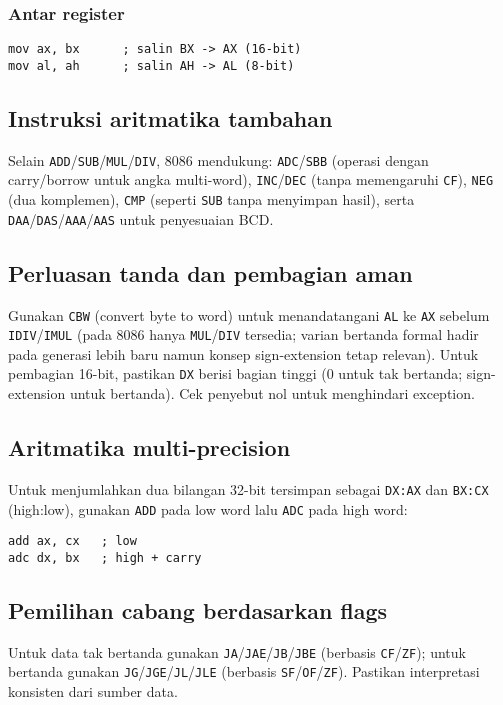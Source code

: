 \subsubsection{Antar register}
\begin{verbatim}
mov ax, bx      ; salin BX -> AX (16-bit)
mov al, ah      ; salin AH -> AL (8-bit)
\end{verbatim}

\subsection{Instruksi aritmatika tambahan}
Selain \texttt{ADD}/\texttt{SUB}/\texttt{MUL}/\texttt{DIV}, 8086 mendukung: \texttt{ADC}/\texttt{SBB} (operasi dengan carry/borrow untuk angka multi-word), \texttt{INC}/\texttt{DEC} (tanpa memengaruhi \texttt{CF}), \texttt{NEG} (dua komplemen), \texttt{CMP} (seperti \texttt{SUB} tanpa menyimpan hasil), serta \texttt{DAA}/\texttt{DAS}/\texttt{AAA}/\texttt{AAS} untuk penyesuaian BCD. \cite{intel2019manual32,rbil}

\subsection{Perluasan tanda dan pembagian aman}
Gunakan \texttt{CBW} (convert byte to word) untuk menandatangani \texttt{AL} ke \texttt{AX} sebelum \texttt{IDIV}/\texttt{IMUL} (pada 8086 hanya \texttt{MUL}/\texttt{DIV} tersedia; varian bertanda formal hadir pada generasi lebih baru namun konsep sign-extension tetap relevan). Untuk pembagian 16-bit, pastikan \texttt{DX} berisi bagian tinggi (0 untuk tak bertanda; sign-extension untuk bertanda). Cek penyebut nol untuk menghindari exception. \cite{intel2019manual32}

\subsection{Aritmatika multi-precision}
Untuk menjumlahkan dua bilangan 32-bit tersimpan sebagai \texttt{DX:AX} dan \texttt{BX:CX} (high:low), gunakan \texttt{ADD} pada low word lalu \texttt{ADC} pada high word:
\begin{verbatim}
add ax, cx   ; low
adc dx, bx   ; high + carry
\end{verbatim}

\subsection{Pemilihan cabang berdasarkan flags}
Untuk data tak bertanda gunakan \texttt{JA}/\texttt{JAE}/\texttt{JB}/\texttt{JBE} (berbasis \texttt{CF}/\texttt{ZF}); untuk bertanda gunakan \texttt{JG}/\texttt{JGE}/\texttt{JL}/\texttt{JLE} (berbasis \texttt{SF}/\texttt{OF}/\texttt{ZF}). Pastikan interpretasi konsisten dari sumber data. \cite{intel2019manual32}

